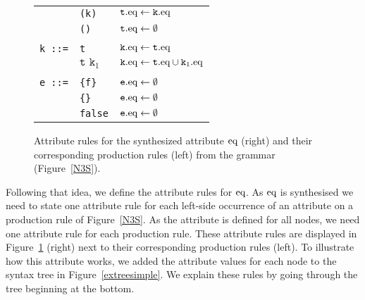 \begin{figure}
\begin{tabular}{lll}
      & \texttt{(k)}& $\texttt{t}.\text{eq} \leftarrow\texttt{k}.\text{eq}$\\
      & \texttt{()}& $\texttt{t}.\text{eq} \leftarrow\emptyset$\\
      &&\\
\texttt{k ::=}& \texttt{t}& $\texttt{k}.\text{eq} \leftarrow\texttt{t}.\text{eq}$\\
&$\texttt{t k}_1$ & $\texttt{k}.\text{eq} \leftarrow\texttt{t}.\text{eq}\cup\texttt{k}_1.\text{eq}$\\
&&\\
\texttt{e ::=}&\texttt{\{f\}} &                $\texttt{e}.\text{eq} \leftarrow\emptyset$\\
       &\texttt{\{\}} &  $\texttt{e}.\text{eq} \leftarrow\emptyset$\\
       &\texttt{false}       &                $\texttt{e}.\text{eq} \leftarrow\emptyset$\\
  \hline
\end{tabular}
\caption{Attribute rules for the synthesized attribute $\text{eq}$ (right) and their corresponding production rules (left) from the \nthree grammar (Figure~\ref{N3S}).\label{EQ}}
\end{figure}
%
%

Following that idea, we define the attribute rules for $\text{eq}$.
As $\text{eq}$ is synthesised %
we need to state one attribute rule  for each left-side occurrence of an attribute on a production rule of Figure~\ref{N3S}. 
As the attribute is defined for all nodes, we need one attribute rule for each production rule.
% 
% 
% 
% 
% 
These attribute rules are displayed in Figure~\ref{EQ} (right) next to their corresponding production rules (left). 
To illustrate how this attribute works, we added the attribute values for each node to the syntax tree in Figure~\ref{extreesimple}.
We explain these rules by going through the tree %
beginning at the bottom.

